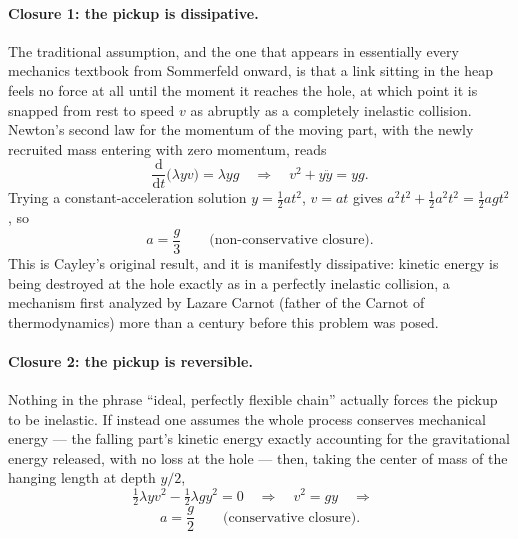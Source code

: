 \documentclass[11pt]{book}
\newcommand{\dd}{\mathrm{d}}
\begin{document}
\paragraph{Closure 1: the pickup is dissipative.} The traditional assumption, and the one that appears in essentially every mechanics textbook from Sommerfeld onward, is that a link sitting in the heap feels no force at all until the moment it reaches the hole, at which point it is snapped from rest to speed $v$ as abruptly as a completely inelastic collision. Newton's second law for the momentum of the moving part, with the newly recruited mass entering with zero momentum, reads
\[
\frac{\dd}{\dd t}\big(\lambda y v\big) = \lambda y g \quad\Longrightarrow\quad v^2 + y\ddot y = yg.
\]
Trying a constant-acceleration solution $y=\tfrac12 a t^2$, $v=at$ gives $a^2t^2 + \tfrac12 a^2 t^2 = \tfrac12 agt^2$, so
\begin{equation}
a = \frac{g}{3} \qquad \text{(non-conservative closure).}
\label{eq:g3}
\end{equation}
This is Cayley's original result, and it is manifestly dissipative: kinetic energy is being destroyed at the hole exactly as in a perfectly inelastic collision, a mechanism first analyzed by Lazare Carnot (father of the Carnot of thermodynamics) more than a century before this problem was posed.

\paragraph{Closure 2: the pickup is reversible.} Nothing in the phrase ``ideal, perfectly flexible chain'' actually forces the pickup to be inelastic. If instead one assumes the whole process conserves mechanical energy --- the falling part's kinetic energy exactly accounting for the gravitational energy released, with no loss at the hole --- then, taking the center of mass of the hanging length at depth $y/2$,
\[
\tfrac12 \lambda y v^2 - \tfrac12 \lambda g y^2 = 0 \quad\Longrightarrow\quad v^2 = gy \quad\Longrightarrow\quad
\]
\begin{equation}
a = \frac{g}{2} \qquad \text{(conservative closure).}
\label{eq:g2}
\end{equation}
\end{document}
